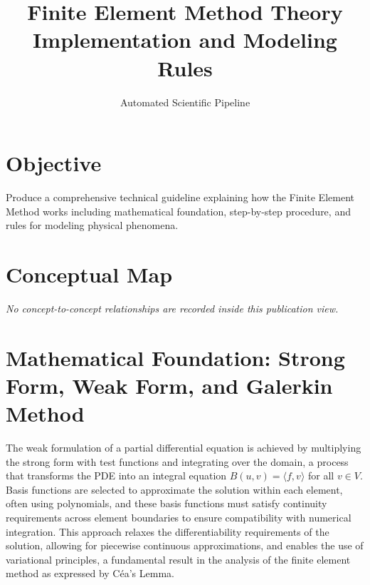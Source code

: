 \documentclass[12pt, a4paper]{article}
\title{Finite Element Method Theory Implementation and Modeling Rules}
\author{Automated Scientific Pipeline}
\date{}
\begin{document}
\maketitle
\tableofcontents
\newpage

\section{Objective}
Produce a comprehensive technical guideline explaining how the Finite Element Method works
including mathematical foundation, step-by-step procedure, and rules for modeling physical phenomena.


\section{Conceptual Map}
\label{sec:1fdafb74-d6f0-59b7-8e42-1b238ea1c0c6}

\begin{center}
\end{center}
\par\small\textit{No concept-to-concept relationships are recorded inside this publication view.}

\section{Mathematical Foundation: Strong Form, Weak Form, and Galerkin Method}
\label{sec:cd8ada70-e71a-4090-8980-b998d063463a}

The weak formulation of a partial differential equation is achieved by multiplying the strong form with test functions and integrating over the domain, a process that transforms the PDE into an integral equation \(B(u, v) = \langle f, v \rangle\) for all \(v \in V\). Basis functions are selected to approximate the solution within each element, often using polynomials, and these basis functions must satisfy continuity requirements across element boundaries to ensure compatibility with numerical integration. This approach relaxes the differentiability requirements of the solution, allowing for piecewise continuous approximations, and enables the use of variational principles, a fundamental result in the analysis of the finite element method as expressed by Céa's Lemma.
\end{document}
